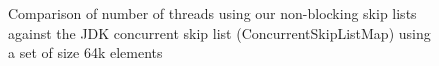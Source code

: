 \begin{figure}
\begin{center}
	\end{center}
	\caption{Comparison of number of threads using our non-blocking skip lists against the JDK concurrent skip list (ConcurrentSkipListMap) using a set of size 64k elements}
\end{figure}



